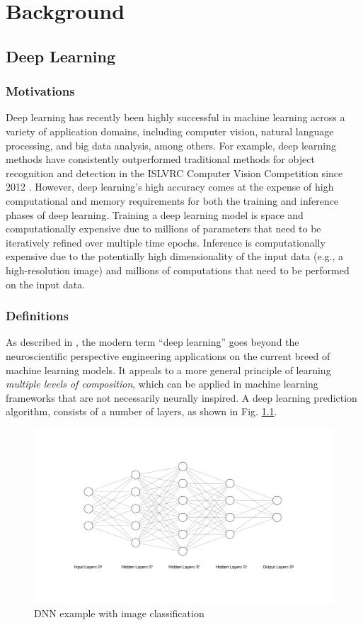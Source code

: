 \chapter{Background}

\section{Deep Learning}
\subsection{Motivations}
Deep learning has recently been highly successful in machine learning across a variety of application domains, including computer vision, natural language processing, and big data analysis, among others. For example, deep learning methods have consistently outperformed traditional methods for object recognition and detection in the ISLVRC Computer Vision Competition since 2012 \cite{ILSVRC15}. However, deep learning’s high accuracy comes at the expense of high computational and memory requirements for both the training and inference phases of deep learning. Training a deep learning model is space and computationally expensive due to millions of parameters that need to be iteratively refined over multiple time epochs. Inference is computationally expensive due to the potentially high dimensionality of the input data (e.g., a high-resolution image) and millions of computations that need to be performed on the input data.

\subsection{Definitions}
As described in \cite{Goodfellow-et-al-2016}, the modern term “deep learning” goes beyond the neuroscientific perspective engineering applications on the current breed of machine learning models. It appeals to a more general principle of learning \textit{multiple levels of composition}, which can be applied in machine learning frameworks that are not necessarily neurally inspired.
A deep learning prediction algorithm, consists of a number of layers, as shown in Fig. \ref{fig:dnn}.

\begin{figure}
	\includegraphics[width=\textwidth]{images/nn.png}
	\caption[DNN example]{DNN example with image classification}
	\label{fig:dnn}
\end{figure}

